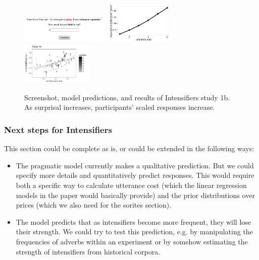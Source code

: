 \documentclass{article}
\begin{document}
   \begin{figure}[bht]
      \begin{center}
         \includegraphics[width=0.38\textwidth]{images/exp1-q.png}
         \includegraphics[width=0.3\textwidth]{images/height-by-cost.pdf}
         \includegraphics[width=0.3\textwidth]{images/plot_study1b.pdf}
      \end{center}
      \caption{Screenshot, model predictions, and results of Intensifiers study 1b. As surprisal increases, participants' scaled responses increase.} 
      \label{fig:intensifiers}
   \end{figure}

   \subsubsection{Next steps for Intensifiers}

   This section could be complete as is, or could be extended in the following ways:

  	\begin{itemize}
      \item{The pragmatic model currently makes a qualitative prediction.
      But we could specify more details and quantitatively predict responses.
      This would require both a specific way to calculate utterance cost (which the linear regression models in the paper would basically provide) and the prior distributions over prices (which we also need for the sorites section).}
      \item{The model predicts that as intensifiers become more frequent, they will lose their strength.
      We could try to test this prediction, e.g. by manipulating the frequencies of adverbs within an experiment or by somehow estimating the strength of intensifiers from historical corpora.}
   \end{itemize}
\end{document}
